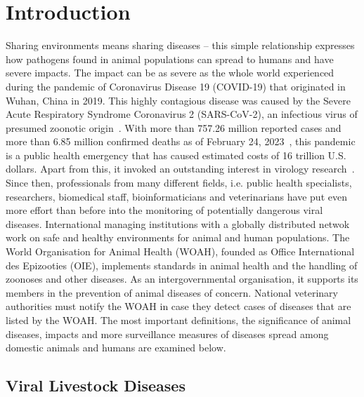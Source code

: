 \chapter{Introduction}\label{chap:introduction}


Sharing environments means sharing diseases -- this simple relationship expresses how pathogens found in animal populations can spread to humans and have severe impacts. The impact can be as severe as the whole world experienced during the pandemic of Coronavirus Disease 19 (COVID-19) that originated in Wuhan, China in 2019. This highly contagious disease was caused by the Severe Acute Respiratory Syndrome Coronavirus 2 (SARS-CoV-2), an infectious virus of presumed zoonotic origin~\cite{wu2020new}. With more than 757.26 million reported cases and more than 6.85 million confirmed deaths as of February 24, 2023~, this pandemic is a public health emergency that has caused estimated costs of 16 trillion U.S. dollars. Apart from this, it invoked an outstanding interest in virology research~\cite{covid}. \\
Since then, professionals from many different fields, i.e. public health specialists, researchers, biomedical staff, bioinformaticians and veterinarians have put even more effort than before into the monitoring of potentially dangerous viral diseases. International managing institutions with a globally distributed netwok work on safe and healthy environments for animal and human populations. The World Organisation for Animal Health (WOAH), founded as Office International des Epizooties (OIE), implements standards in animal health and the handling of zoonoses and other diseases. As an intergovernmental organisation, it supports its members in the prevention of animal diseases of concern. National veterinary authorities must notify the WOAH in case they detect cases of diseases that are listed by the WOAH. The most important definitions, the significance of animal diseases, impacts and more surveillance measures of diseases spread among domestic animals and humans are examined below.

\section{Viral Livestock Diseases}\label{sec:viral}

